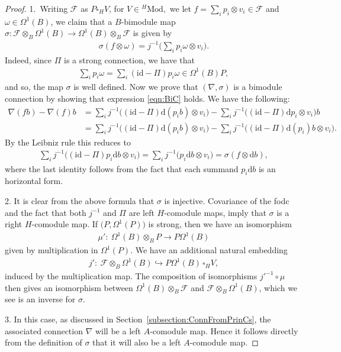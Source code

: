 \documentclass[10pt,a4paper]{amsart}
\numberwithin{equation}{section}
\begin{document}
\begin{proof}
1.~Writing $\mathcal{F}$ as $P\square_H V$, for $V\in {}^H\mathrm{Mod},$ we let $f= \sum_i p_i\otimes v_i \in \mathcal{F}$ and $\omega \in \Omega^1(B)$, we claim that a $B$-bimodule map $\sigma\colon \mathcal{F} \otimes_B \Omega^1(B) \to \Omega^1(B) \otimes_B \mathcal{F}$ is given by
\begin{gather*}
 \sigma\left(f \otimes \omega\right)= j^{-1}\bigg(\sum_i p_{i}\omega \otimes v_{i}\bigg) .
\end{gather*}
Indeed, since $\Pi$ is a strong connection, we have that
\begin{gather*}
 \sum_i p_{i}\omega= \sum_i (\mathrm{id} - \Pi)p_{i}\omega\in \Omega^1(B) P,
\end{gather*}
and so, the map $\sigma$ is well defined.
Now we prove that $(\nabla, \sigma)$ is a bimodule connection by showing that expression \eqref{eqn:BiC} holds. We have the following:
\begin{align*}
\nabla(fb)-\nabla(f)b & = \sum_i j^{-1} \big((\mathrm{id} - \Pi)\mathrm{d}( p_{i}b) \otimes v_i \big)-\sum_i j^{-1} \big((\mathrm{id} - \Pi)\mathrm{d} p_{i} \otimes v_i\big)b
\\
&=\sum_i j^{-1} \big((\mathrm{id} - \Pi)\mathrm{d}( p_{i}b) \otimes v_i \big)-\sum_i j^{-1} \big((\mathrm{id} - \Pi)\mathrm{d}(p_{i})b \otimes v_i\big).
\end{align*}
By the Leibniz rule this reduces to
\begin{gather*}
 \sum_i j^{-1} \big((\mathrm{id} - \Pi) p_{i}\mathrm{d} b\otimes v_{i}\big) =\sum_i j^{-1} \big(p_{i}\mathrm{d} b\otimes v_{i}\big)= \sigma (f\otimes \mathrm{d} b),
\end{gather*}
where the last identity follows from the fact that each summand $p_{i}\mathrm{d} b$ is an horizontal form.

2. It is clear from the above formula that $\sigma$ is injective. Covariance of the fodc and the fact that both $j^{-1}$ and $\Pi$ are left $H$-comodule maps, imply that $\sigma$ is a right $H$-comodule map. If $\big(P, \Omega^1(P)\big)$ is strong, then we have an isomorphism
\begin{align*}
\mu'\colon \ \Omega^1(B) \otimes_B P \to P\Omega^1(B)
\end{align*}
given by multiplication in $\Omega^1(P)$. We have an additional natural embedding
\begin{gather*}
j'\colon \ \mathcal{F} \otimes_B \Omega^1(B)\hookrightarrow P\Omega^1(B) \, \square_H V,
\end{gather*}
induced by the multiplication map. The composition of isomorphisms $j'^{-1}\circ\mu$ then gives an isomorphism between $\Omega^1(B) \otimes_B \mathcal{F} $ and $ \mathcal{F} \otimes_B \Omega^1(B)$, which we see is an inverse for $\sigma$.

3. In this case, as discussed in Section~\ref{subsection:ConnFromPrinCs}, the associated connection $\nabla$ will be a left $A$-comodule map. Hence it follows directly from the definition of $\sigma$ that it will also be a left $A$-comodule map.
\end{proof}
\end{document}
